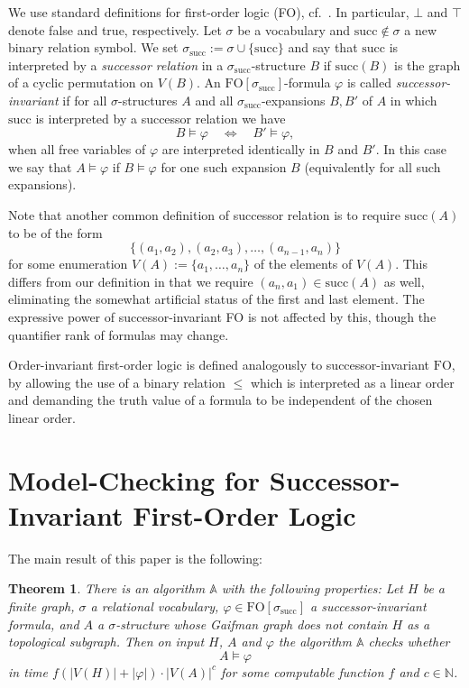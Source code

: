 \documentclass[12pt]{amsart}
\newtheorem{theorem}{Theorem}[section]
\newcommand{\absval}[1]{\left\vert #1 \right\vert}
\newcommand{\suc}{\mathrm{succ}}
\newcommand{\FO}{\textrm{FO}}
\newcommand{\N}{\mathds{N}}
\begin{document}
We use standard definitions for first-order logic (FO),
cf.~\cite{eft96,ebbflu99,lib04}. In particular, $\bot$ and $\top$
denote false and true, respectively. Let $\sigma$ be a vocabulary and
$\suc \not\in \sigma$ a new binary relation symbol. We set
$\sigma_\suc := \sigma\cup\{\suc\}$ and say that $\suc$ is interpreted
by a \emph{successor relation} in a $\sigma_\suc$-structure $B$ if
$\suc(B)$ is the graph of a cyclic permutation on $V(B)$. An
$\FO[\sigma_\suc]$-formula $\varphi$ is called
\emph{successor-invariant} if for all $\sigma$-structures $A$ and all
$\sigma_\suc$-expansions $B,B'$ of $A$ in which $\suc$ is interpreted
by a successor relation we have
\[
B \models \varphi \quad\Leftrightarrow\quad
B' \models \varphi,
\]
when all free variables of $\varphi$ are interpreted identically in
$B$ and $B'$. In this case we say that $A \models \varphi$ if $B
\models \varphi$ for one such expansion $B$ (equivalently for all such
expansions).

Note that another common definition of successor relation is to
require $\suc(A)$ to be of the form
\[
\{ (a_{1},a_{2}), (a_{2},a_{3}),\ldots,(a_{n-1},a_{n}) \}
\]
for some enumeration $V(A) := \{ a_1,\ldots,a_n \}$ of the elements of
$V(A)$. This differs from our definition in that we require $(a_n,a_1)
\in \suc(A)$ as well, eliminating the somewhat artificial status of
the first and last element. The expressive power of
successor-invariant FO is not affected by this, though the quantifier
rank of formulas may change.

Order-invariant first-order logic is defined analogously to
successor-invariant $\FO$, by allowing the use of a binary relation
$\leq$ which is interpreted as a linear order and demanding the truth
value of a formula to be independent of the chosen linear order.



\section{Model-Checking for Successor-Invariant First-Order Logic}

The main result of this paper is the following:
\begin{theorem}
  \label{thm:mainthm}
  There is an algorithm $\mathds{A}$ with the following properties:
  Let $H$ be a finite graph, $\sigma$ a relational vocabulary, $\varphi
  \in \FO[\sigma_{\mathrm{succ}}]$ a successor-invariant formula, and
  $A$ a $\sigma$-structure whose Gaifman graph does not contain $H$ as
  a topological subgraph. Then on input $H$, $A$ and $\varphi$ the
  algorithm $\mathds{A}$ checks whether
  \[
  A \models \varphi
  \]
  in time $f(\absval{V(H)} + \absval{\varphi})\cdot \absval{V(A)}^c$ for some
  computable function $f$ and $c \in \N$.
\end{theorem}
\end{document}
